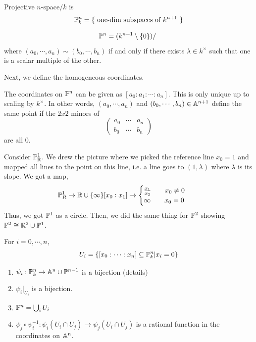 \documentclass[12pt]{article}
\begin{document}
\begin{definition}
    Projective $n$-space/$k$ is 
    \[ \P^n_k = \{ \text{ one-dim subspaces of $k^{n+1}$ }\}\]
\end{definition}

\begin{lemma}
    \[ \P^n = (k^{n+1}\setminus \{0\})/~\]
    where $(a_0, \cdots, a_n) \sim (b_0, \cdots, b_n)$ if and only if there exists $\lambda \in k^\times$ such that one is a scalar multiple of the other. 
\end{lemma}

Next, we define the homogeneous coordinates. 
\begin{definition}
    The coordinates on $\P^n$ can be given as $[a_0 : a_1 : \cdots : a_n]$. This is only unique up to scaling by $k^\times$. In other words, $(a_0, \cdots, a_n)$ and $(b_0, \cdots, b_n) \in \A^{n+1}$ define the same point if the $2x2$ minors of 
    \[ \begin{pmatrix} 
        a_0 & \cdots & a_n \\ 
        b_0 & \cdots & b_n 
    \end{pmatrix} \] 
    are all $0$. 
\end{definition}

\begin{example}
    Consider $\P^1_\R$. We drew the picture where we picked the reference line $x_0 = 1$ and mapped all lines to the point on this line, i.e. a line goes to $(1, \lambda)$ where $\lambda$ is its slope. We got a map, 
    \begin{align*}
        \P^1_R &\to \R \cup \{\infty\} 
        [x_0 : x_1] \mapsto \begin{cases}
            \frac{x_1}{x_2} \qquad x_0 \neq 0 \\
            \infty \qquad x_0 = 0
        \end{cases}
    \end{align*}
    Thus, we got $\P^1$ as a circle. Then, we did the same thing for $\P^2$ showing $\P^2 \cong \R^2 \cup \P^1$. 
\end{example}

\begin{lemma}
    For $i = 0, \cdots, n$, 
    \[ U_i = \{ [x_0 : \cdots : x_n ] \subseteq \P^n_k | x_i = 0\}\]
    \begin{enumerate}
        \item $\psi_i : \P^n_k \to \A^n \cup \P^{n-1}$ is a bijection (details)
        \item $\psi_i|_{U_i}$ is a bijection.  
        \item $\P^n = \bigcup_i U_i$
        \item $\psi_j \circ \psi_i^{-1}: \psi_i(U_i \cap U_j) \to \psi_j(U_i \cap U_j)$ is a rational function in the coordinates on $\A^n$. 
    \end{enumerate}
\end{lemma}
\end{document}

